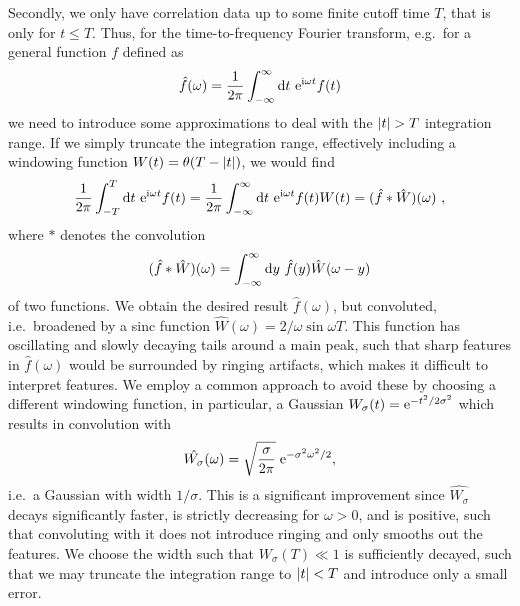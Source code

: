 Secondly, we only have correlation data up to some finite cutoff time $T$, that is only for $t \leq T$.
%
Thus, for the time-to-frequency Fourier transform, e.g.~for a general function $f$ defined as
\begin{equation}
    \hat{f}(\omega) = \frac{1}{2\pi} \int_{-\infty}^\infty \,\! \mathrm{d} {t} \,\! ~ \mathrm{e}^{\mathrm{i}\omega t} f(t)
\end{equation}
we need to introduce some approximations to deal with the $\abs{t} > T$ integration range.
%
If we simply truncate the integration range, effectively including a windowing function $W(t) = \theta(T - \abs{t})$, we would find
\begin{equation}
    \frac{1}{2\pi} \int_{-T}^T \,\! \mathrm{d} {t} \,\! ~ \mathrm{e}^{\mathrm{i}\omega t} f(t)
    = \frac{1}{2\pi} \int_{-\infty}^\infty \,\! \mathrm{d} {t} \,\! ~ \mathrm{e}^{\mathrm{i}\omega t} f(t) W(t)
    = (\hat{f} * \hat{W})(\omega)
    ~,
\end{equation}
where $*$ denotes the convolution
\begin{equation}
    (\hat{f} * \hat{W})(\omega) = \int_{-\infty}^\infty \,\! \mathrm{d} {y} \,\! ~ \hat{f}(y) \hat{W}(\omega - y)
\end{equation}
of two functions.
%
We obtain the desired result $\hat{f}(\omega)$, but convoluted, i.e.~broadened by a sinc function $\hat{W}(\omega) = 2 / \omega \sin \omega T$.
%
This function has oscillating and slowly decaying tails around a main peak, such that sharp features in $\hat{f}(\omega)$ would be surrounded by ringing artifacts, which makes it difficult to interpret features.
%
We employ a common approach to avoid these by choosing a different windowing function, in particular, a Gaussian $W_\sigma(t) = \mathrm{e}^{-t^2/2\sigma^2}$ which results in convolution with
\begin{equation}
    \hat{W_\sigma}(\omega) = \sqrt{\frac{\sigma}{2 \pi}} \; \mathrm{e}^{-\sigma^2 \omega^2 / 2}
    ,
\end{equation}
i.e.~a Gaussian with width $1 / \sigma$.
%
This is a significant improvement since $\hat{W_\sigma}$ decays significantly faster, is strictly decreasing for $\omega > 0$, and is positive, such that convoluting with it does not introduce ringing and only smooths out the features.
%
We choose the width such that $W_\sigma(T) \ll 1$ is sufficiently decayed, such that we may truncate the integration range to $\abs{t} < T$ and introduce only a small error.


